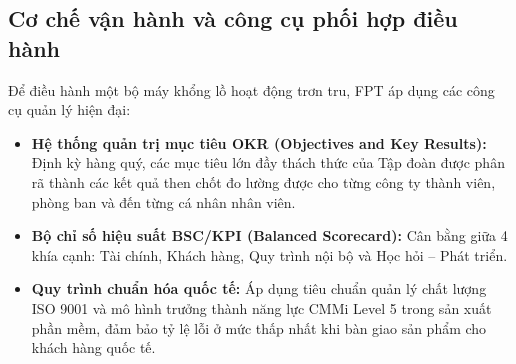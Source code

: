 \subsection{Cơ chế vận hành và công cụ phối hợp điều hành}
Để điều hành một bộ máy khổng lồ hoạt động trơn tru, FPT áp dụng các công cụ quản lý hiện đại:
\begin{itemize}
    \item \textbf{Hệ thống quản trị mục tiêu OKR (Objectives and Key Results):} Định kỳ hàng quý, các mục tiêu lớn đầy thách thức của Tập đoàn được phân rã thành các kết quả then chốt đo lường được cho từng công ty thành viên, phòng ban và đến từng cá nhân nhân viên.
    \item \textbf{Bộ chỉ số hiệu suất BSC/KPI (Balanced Scorecard):} Cân bằng giữa 4 khía cạnh: Tài chính, Khách hàng, Quy trình nội bộ và Học hỏi -- Phát triển.
    \item \textbf{Quy trình chuẩn hóa quốc tế:} Áp dụng tiêu chuẩn quản lý chất lượng ISO 9001 và mô hình trưởng thành năng lực CMMi Level 5 trong sản xuất phần mềm, đảm bảo tỷ lệ lỗi ở mức thấp nhất khi bàn giao sản phẩm cho khách hàng quốc tế.
\end{itemize}

